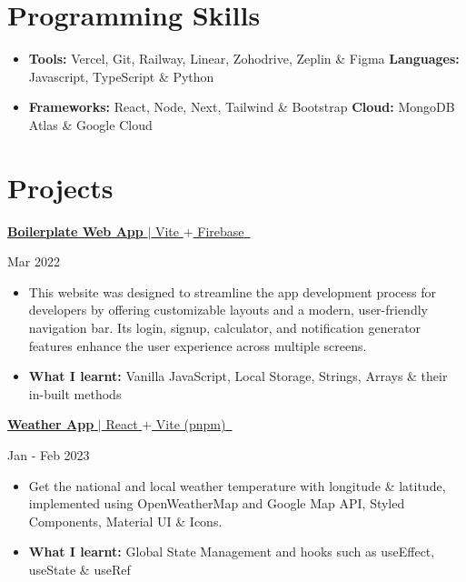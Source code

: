 \documentclass[letterpaper,11pt]{article}
\newcommand{\resumeItem}[2]{
  \item\small{
    \textbf{#1}{#2 \vspace{-2pt}}
  }
}
\newcommand{\project}[2]{
\textbf{}{
\href{#2}{{#1} \,\faExternalLink}
}
    \hfill
}
\newcommand{\projectHeading}[3]{\project{#1}{#2}
{#3}\\ \vspace{-1pt}}
\newcommand{\resumeSubHeadingListStart}{\begin{itemize}[leftmargin=*]}
\newcommand{\resumeSubHeadingListEnd}{\end{itemize}}
\newcommand{\resumeItemListStart}{\begin{itemize}}
\newcommand{\resumeItemListEnd}{\end{itemize}\vspace{-5pt}}
\begin{document}
\section{Programming Skills}
\resumeSubHeadingListStart
\item{
      \textbf{Tools: }{Vercel, Git, Railway, Linear, Zohodrive, Zeplin \& Figma}
      \hfill
      \textbf{Languages: }{Javascript, TypeScript \& Python}}
\vspace{-7pt}
\item{
      \textbf{Frameworks: }{React, Node, Next, Tailwind \& Bootstrap}
      \hfill
      \textbf{Cloud: }{MongoDB Atlas \& Google Cloud}}
\resumeSubHeadingListEnd
 
\section{Projects}
\projectHeading{\textbf{Boilerplate Web App} $|$ Vite $+$ Firebase}{https://boilerplatewebapp.vercel.app}{Mar 2022}
\vspace{-5pt}
\resumeItemListStart
\resumeItem{}{This website was designed to streamline the app development process for developers by offering customizable layouts and a modern, user-friendly navigation bar. Its login, signup, calculator, and notification generator features enhance the user experience across multiple screens.}
\vspace{-5pt}
\resumeItem{What I learnt: }{Vanilla JavaScript, Local Storage, Strings, Arrays \& their in-built methods}
\resumeItemListEnd
\vspace{6pt}
\projectHeading{\textbf{Weather App} $|$ React $+$ Vite (pnpm)}{https://github.com/aminoxix/ClimateCheck}{Jan - Feb 2023}
\vspace{-5pt}
\resumeItemListStart
\resumeItem{}{Get the national and local weather temperature with longitude \& latitude, implemented using OpenWeatherMap and Google Map API, Styled Components, Material UI \& Icons.}
\vspace{-5pt}
\resumeItem{What I learnt: }{Global State Management and hooks such as useEffect, useState \& useRef}
\resumeItemListEnd

\end{document}
